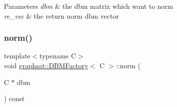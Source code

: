 \begin{DoxyParams}{Parameters}
{\em dbm} & the dbm matrix which want to norm \\
\hline
{\em re\+\_\+vec} & the return norm dbm vector \\
\hline
\end{DoxyParams}
\mbox{\label{classgraphsat_1_1_d_b_m_factory_a51513da611d3b528219e7204498c035b}} 
\subsubsection{\texorpdfstring{norm()}{norm()}\hspace{0.1cm}{\footnotesize\ttfamily [3/4]}}
{\footnotesize\ttfamily template$<$typename C$>$ \\
void \mbox{\hyperlink{classgraphsat_1_1_d_b_m_factory}{graphsat\+::\+D\+B\+M\+Factory}}$<$ C $>$\+::norm (\begin{DoxyParamCaption}\item[{C $\ast$}]{dbm }\end{DoxyParamCaption}) const\hspace{0.3cm}{\ttfamily [inline]}}

